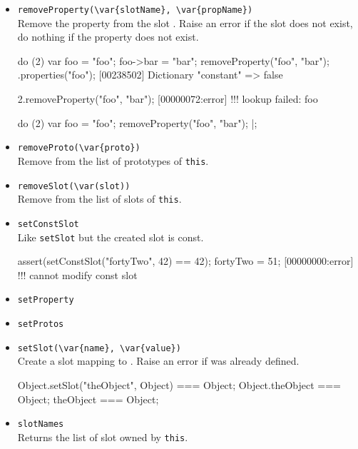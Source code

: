 \begin{itemize}
\item \lstinline|removeProperty(\var{slotName}, \var{propName})|\\
  Remove the property  from the slot .
  Raise an error if the slot does not exist, do nothing if the
  property does not exist.
\begin{urbiscript}
do (2)
{
  var foo = "foo";
  foo->bar = "bar";
  removeProperty("foo", "bar");
}.properties("foo");
[00238502] Dictionary {"constant" => false}

2.removeProperty("foo", "bar");
[00000072:error] !!! lookup failed: foo

do (2)
{
  var foo = "foo";
  removeProperty("foo", "bar");
}|;
\end{urbiscript}

\item \lstinline|removeProto(\var{proto})|\\
  Remove  from the list of prototypes of \lstinline|this|.

\item \lstinline|removeSlot(\var(slot))|\\
  Remove  from the list of slots of \lstinline|this|.

\item \lstinline|setConstSlot|\\
  Like \lstinline|setSlot| but the created slot is const.

\begin{urbiscript}
assert(setConstSlot("fortyTwo", 42) == 42);
fortyTwo = 51;
[00000000:error] !!! cannot modify const slot
\end{urbiscript}

\item \lstinline|setProperty|\\

\item \lstinline|setProtos|\\

\item \lstinline|setSlot(\var{name}, \var{value})|\\
  Create a slot  mapping to . Raise an error if
   was already defined.

\begin{urbiassert}
Object.setSlot("theObject", Object) === Object;
Object.theObject === Object;
theObject === Object;
\end{urbiassert}

\item \lstinline|slotNames|\\
  Returns the list of slot owned by \lstinline|this|.


\end{itemize}
